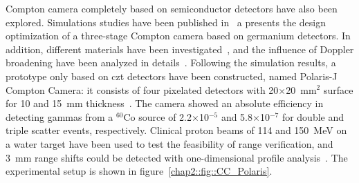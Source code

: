 Compton camera completely based on semiconductor detectors have also been explored. Simulations studies have been published in~\parencite{Peterson2010} a presents the design optimization of a three-stage Compton camera based on germanium detectors. In addition, different materials have been investigated~\parencite{Robertson2011}, and the influence of Doppler broadening have been analyzed in details~\parencite{Mackin2013}. 
Following the simulation results, a prototype only based on \gls{czt} detectors have been constructed, named Polaris-J Compton Camera: it consists of four pixelated detectors with 20$\times$20~mm$^2$ surface for 10 and 15~mm thickness~\parencite{McCleskey2015}. The camera showed an absolute efficiency in detecting gammas from a $^60$Co source of 2.2$\times$10$^{-5}$ and 5.8$\times$10$^{-7}$ for double and triple scatter events, respectively. Clinical proton beams of 114 and 150~MeV on a water target have been used to test the feasibility of range verification, and 3~mm range shifts could be detected with one-dimensional profile analysis~\parencite{Polf2015}. The experimental setup is shown in figure~\ref{chap2::fig::CC_Polaris}.


